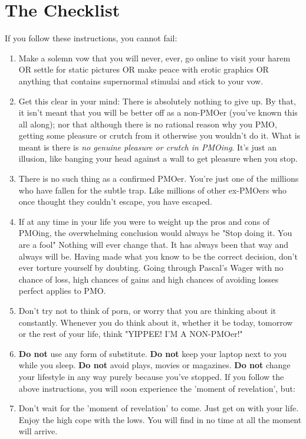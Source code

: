 \documentclass[easypeasy.tex]{subfiles}
\begin{document}
\section{The Checklist}

  If you follow these instructions, you cannot fail:
\begin{enumerate}
    \item Make a solemn vow that you will never, ever, go online to visit your harem OR settle for static pictures OR make peace with erotic graphics OR anything that contains supernormal stimulai and stick to your vow.

    \item Get this clear in your mind: There is absolutely nothing to give up. By that, it isn't meant that you will be better off as a non-PMOer (you've known this all along); nor that although there is no rational reason why you PMO, getting some pleasure or crutch from it otherwise you wouldn't do it. What is meant is there is \textit{no genuine pleasure or crutch in PMOing}. It's just an illusion, like banging your head against a wall to get pleasure when you stop.

    \item There is no such thing as a confirmed PMOer. You're just one of the millions who have fallen for the subtle trap. Like millions of other ex-PMOers who once thought they couldn't escape, you have escaped.

    \item If at any time in your life you were to weight up the pros and cons of PMOing, the overwhelming conclusion would always be "Stop doing it. You are a fool" Nothing will ever change that. It has always been that way and always will be. Having made what you know to be the correct decision, don't ever torture yourself by doubting. Going through Pascal's Wager with no chance of loss, high chances of gains and high chances of avoiding losses perfect applies to PMO.

    \item Don't try not to think of porn, or worry that you are thinking about it constantly. Whenever you do think about it, whether it be today, tomorrow or the rest of your life, think "YIPPEE! I'M A NON-PMOer!"

    \item \textbf{Do not} use any form of substitute. \textbf{Do not} keep your laptop next to you while you sleep. \textbf{Do not} avoid plays, movies or magazines. \textbf{Do not} change your lifestyle in any way purely because you've stopped. If you follow the above instructions, you will soon experience the 'moment of revelation', but:

    \item Don't wait for the 'moment of revelation' to come. Just get on with your life. Enjoy the high cope with the lows. You will find in no time at all the moment will arrive.
\end{enumerate}
\end{document}
